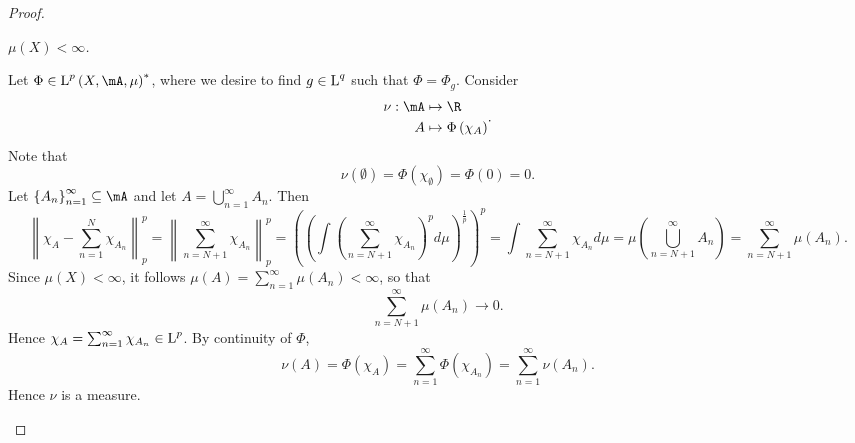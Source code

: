 \documentclass[pmath451]{subfiles}
\begin{document}
\begin{proof}
        \begin{case}
            \textit{$\mu\left( X \right)<\infty$.}

            Let $\Phi\in\LLL^p\left( X,\mA,\mu \right)^{*}$, where we desire to find $g\in\operatorname{L}^q$ such that $\Phi=\Phi_g$. Consider
            \begin{equation*}
                \begin{aligned}
                    \nu:\mA&\mapsto\R \\
                    A & \mapsto \Phi\left( \chi_A \right)
                \end{aligned} .
            \end{equation*}
            Note that
            \begin{equation*}
                \nu\left( \emptyset \right) = \Phi\left( \chi_{\emptyset} \right) = \Phi\left( 0 \right) = 0.
            \end{equation*}
            Let $\left\lbrace A_n \right\rbrace^{\infty}_{n=1}\subseteq\mA$ and let $A = \bigcup^{\infty}_{n=1} A_n$. Then
            \begin{equation*}
                \left\lVert \chi_A-\sum^{N}_{n=1}\chi_{A_n}\right\rVert^p_p = \left\lVert \sum^{\infty}_{n=N+1}\chi_{A_n}\right\rVert^p_p = \left( \left( \int\left( \sum^{\infty}_{n=N+1} \chi_{A_n} \right)^{p}d\mu \right)^{\frac{1}{p}} \right)^p = \int \sum^{\infty}_{n=N+1} \chi_{A_n}d\mu = \mu\left( \bigcup^{\infty}_{n=N+1} A_n \right) = \sum^{\infty}_{n=N+1} \mu\left( A_n \right).
            \end{equation*}
            Since $\mu\left( X \right)<\infty$, it follows $\mu\left( A \right) = \sum^{\infty}_{n=1} \mu\left( A_n \right) < \infty$, so that
            \begin{equation*}
                \sum^{\infty}_{n=N+1}\mu\left( A_n \right)\to 0.
            \end{equation*}
            Hence $\chi_A = \sum^{\infty}_{n=1} \chi_{A_n}\in\operatorname{L}^p$. By continuity of $\Phi$,
            \begin{equation*}
                \nu\left( A \right) = \Phi\left( \chi_A \right) = \sum^{\infty}_{n=1} \Phi\left( \chi_{A_n} \right) = \sum^{\infty}_{n=1} \nu\left( A_n \right).
            \end{equation*}
            Hence $\nu$ is a measure. 


\end{case}
\end{proof}
\end{document}
